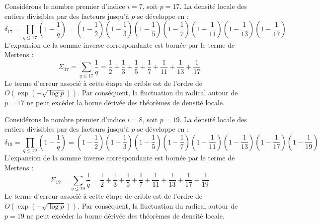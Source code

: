 \documentclass[12pt, a4paper]{article}
\begin{document}
Considérons le nombre premier d'indice $i = 7$, soit $p = 17$. La densité locale des entiers divisibles par des facteurs jusqu'à $p$ se développe en :
\begin{equation}
\delta_{17} = \prod_{q \le 17} \left( 1 - \frac{1}{q} \right) = \left(1 - \frac{1}{2}\right) \left(1 - \frac{1}{3}\right) \left(1 - \frac{1}{5}\right) \left(1 - \frac{1}{7}\right) \left(1 - \frac{1}{11}\right) \left(1 - \frac{1}{13}\right) \left(1 - \frac{1}{17}\right)
\end{equation}
L'expansion de la somme inverse correspondante est bornée par le terme de Mertens :
\begin{equation}
\Sigma_{17} = \sum_{q \le 17} \frac{1}{q} = \frac{1}{2} + \frac{1}{3} + \frac{1}{5} + \frac{1}{7} + \frac{1}{11} + \frac{1}{13} + \frac{1}{17}
\end{equation}
Le terme d'erreur associé à cette étape de crible est de l'ordre de $O(\exp(-\sqrt{\log p}))$. Par conséquent, la fluctuation du radical autour de $p=17$ ne peut excéder la borne dérivée des théorèmes de densité locale.


Considérons le nombre premier d'indice $i = 8$, soit $p = 19$. La densité locale des entiers divisibles par des facteurs jusqu'à $p$ se développe en :
\begin{equation}
\delta_{19} = \prod_{q \le 19} \left( 1 - \frac{1}{q} \right) = \left(1 - \frac{1}{2}\right) \left(1 - \frac{1}{3}\right) \left(1 - \frac{1}{5}\right) \left(1 - \frac{1}{7}\right) \left(1 - \frac{1}{11}\right) \left(1 - \frac{1}{13}\right) \left(1 - \frac{1}{17}\right) \left(1 - \frac{1}{19}\right)
\end{equation}
L'expansion de la somme inverse correspondante est bornée par le terme de Mertens :
\begin{equation}
\Sigma_{19} = \sum_{q \le 19} \frac{1}{q} = \frac{1}{2} + \frac{1}{3} + \frac{1}{5} + \frac{1}{7} + \frac{1}{11} + \frac{1}{13} + \frac{1}{17} + \frac{1}{19}
\end{equation}
Le terme d'erreur associé à cette étape de crible est de l'ordre de $O(\exp(-\sqrt{\log p}))$. Par conséquent, la fluctuation du radical autour de $p=19$ ne peut excéder la borne dérivée des théorèmes de densité locale.
\end{document}
